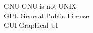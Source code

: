 \begin{tabbing}








    \>GNU \>\>GNU is not UNIX\\






    \>GPL \>\>General Public License\\





    \>GUI \>\>Graphical UI\\



\end{tabbing}

